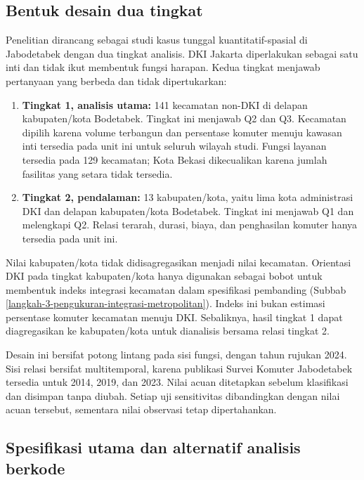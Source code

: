 \documentclass[12pt,a4paper,oneside,openany,indonesian]{report}
\begin{document}
\subsection{Bentuk desain dua tingkat}\label{bentuk-desain}

Penelitian dirancang sebagai studi kasus tunggal kuantitatif-spasial di
Jabodetabek dengan dua tingkat analisis. DKI Jakarta diperlakukan sebagai
satu inti dan tidak ikut membentuk fungsi harapan. Kedua tingkat
menjawab pertanyaan yang berbeda dan tidak dipertukarkan:

\begin{enumerate}
\tightlist
\item
  \textbf{Tingkat 1, analisis utama:} 141 kecamatan non-DKI di delapan
  kabupaten/kota Bodetabek. Tingkat ini menjawab Q2 dan Q3. Kecamatan
  dipilih karena volume terbangun dan persentase komuter menuju kawasan
  inti tersedia pada unit ini untuk seluruh wilayah studi. Fungsi
  layanan tersedia pada 129 kecamatan; Kota Bekasi dikecualikan karena
  jumlah fasilitas yang setara tidak tersedia.
\item
  \textbf{Tingkat 2, pendalaman:} 13 kabupaten/kota, yaitu lima kota
  administrasi DKI dan delapan kabupaten/kota Bodetabek. Tingkat ini
  menjawab Q1 dan melengkapi Q2. Relasi terarah, durasi, biaya, dan
  penghasilan komuter hanya tersedia pada unit ini.
\end{enumerate}

Nilai kabupaten/kota tidak didisagregasikan menjadi nilai kecamatan.
Orientasi DKI pada tingkat kabupaten/kota hanya digunakan sebagai bobot
untuk membentuk indeks integrasi kecamatan dalam spesifikasi pembanding
(Subbab \ref{langkah-3-pengukuran-integrasi-metropolitan}). Indeks ini
bukan estimasi persentase komuter kecamatan menuju DKI. Sebaliknya, hasil
tingkat 1 dapat diagregasikan ke kabupaten/kota untuk dianalisis bersama
relasi tingkat 2.

Desain ini bersifat potong lintang pada sisi fungsi, dengan tahun
rujukan 2024. Sisi relasi bersifat multitemporal, karena publikasi
Survei Komuter Jabodetabek tersedia untuk 2014, 2019, dan 2023. Nilai
acuan ditetapkan sebelum klasifikasi dan disimpan tanpa diubah.
Setiap uji sensitivitas dibandingkan dengan nilai acuan tersebut,
sementara nilai observasi tetap dipertahankan.

\subsection{Spesifikasi utama dan alternatif analisis berkode}\label{spesifikasi-utama-dan-cadangan}
\end{document}

